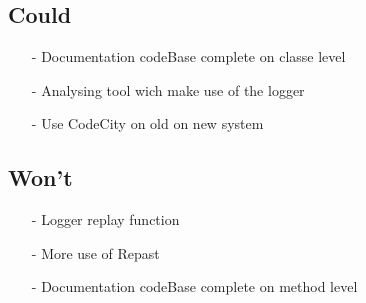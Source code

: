 \documentclass[11pt,a4paper]{article}
\begin{document}
\subsection*{Could}
\begin{enumerate}
\item[-] Documentation codeBase complete on classe level
\item[-] Analysing tool wich make use of the logger
\item[-] Use CodeCity on old on new system
\end{enumerate}

\subsection*{Won't}
\begin{enumerate}
\item[-] Logger replay function
\item[-] More use of Repast
\item[-] Documentation codeBase complete on method level
\end{enumerate}
\end{document}
